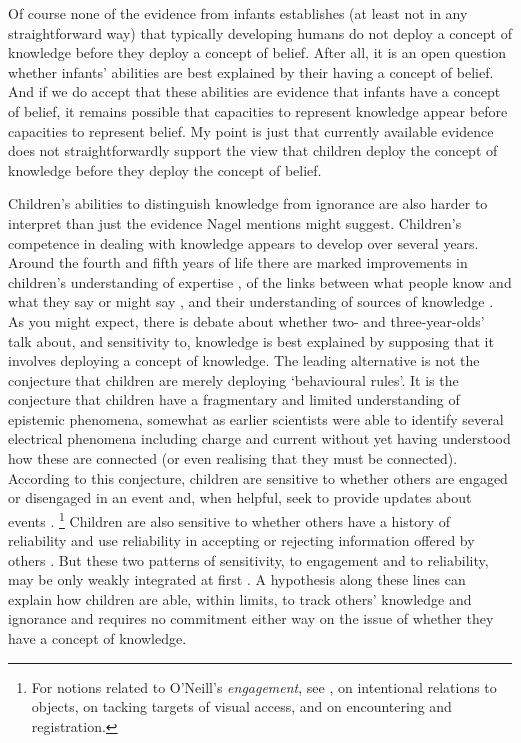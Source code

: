 \documentclass[11pt,a4paper]{extarticle}
\begin{document}
Of course none of the evidence from infants
 establishes (at least not in any straightforward way) that typically developing humans do not deploy a concept of knowledge before they deploy a concept of belief.
After all, it is an open question whether infants' abilities are best explained by their having a concept of belief.
And if we do accept that these abilities are evidence that infants have a concept of belief, 
it remains possible that capacities to represent knowledge appear before capacities to represent belief.
My point is just that currently available evidence does not straightforwardly support the view that children deploy the concept of knowledge before they deploy the concept of belief.

Children's abilities to distinguish knowledge from ignorance are also harder to interpret than just the evidence Nagel mentions might suggest.
Children's competence in dealing with knowledge appears to develop over several years.
Around the fourth and fifth years of life there are marked improvements in 
children's understanding of expertise 
\citep{lutz_early_2002,sobel_children_2010},
of the links between what people know and what they say or might say \citep{Robinson:1994nw,Robinson:2010uq},
and their understanding of sources of knowledge \citep{ONeill:1992ct,ONeill:2001co,Robinson:2006vl}.
As you might expect,
there is debate about whether two- and three-year-olds' talk about, and sensitivity to, knowledge is best explained by supposing that it involves deploying a concept of knowledge.
The leading alternative is not the conjecture that children are merely deploying `behavioural rules'.
It is the conjecture that children have a fragmentary and limited understanding of epistemic phenomena, somewhat as earlier scientists were able to identify several electrical phenomena including charge and current without yet having understood how these are connected (or even realising that they must be connected).
According to this conjecture, children are sensitive to whether others are engaged or disengaged in an event and, when helpful, seek to provide updates about events \citep[pp.\ 88-9]{ONeill:2005ff}.%
\footnote{
For notions related to O'Neill's \emph{engagement}, see 
\citet{Doherty:2006wz}, 
\citet{Gomez:2007fk} on intentional relations to objects, 
 \citet[p.\ 58]{Call:2005qe} on tacking targets of visual access,
and \citet{butterfill_minimal} on encountering and registration.
}
Children are also sensitive to whether others have a history of reliability and use reliability in accepting or rejecting information offered by others \citep{Koenig:2005rc,birch_three-_2008}.
But these two patterns of sensitivity, to engagement and to reliability, may be only weakly integrated at first \citep{nurmsoo_childrens_2009,nurmsoo_identifying_2009}.
A hypothesis along these lines can explain how children are able, within limits, to track others' knowledge and ignorance 
and requires no commitment either way on the issue of whether they have a concept of knowledge.
\end{document}
